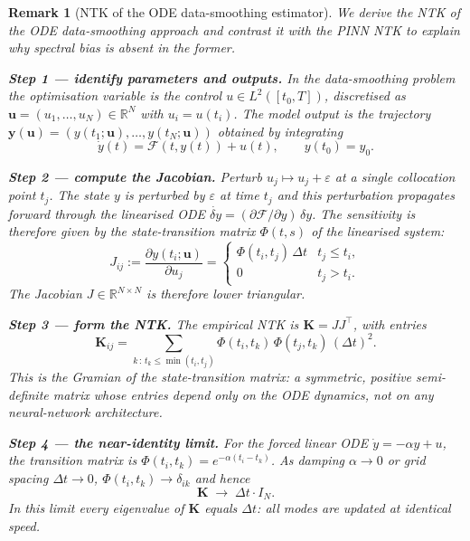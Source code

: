\documentclass{article}
\newtheorem{remark}{Remark}
\begin{document}
\begin{remark}[NTK of the ODE data-smoothing estimator]
We derive the NTK of the ODE data-smoothing approach and contrast it with the
PINN NTK to explain why spectral bias is absent in the former.

\medskip
\noindent\textbf{Step 1 — identify parameters and outputs.}
In the data-smoothing problem the optimisation variable is the control
$u\in L^2([t_0,T])$, discretised as $\mathbf{u}=(u_1,\ldots,u_N)\in\mathbb{R}^N$
with $u_i=u(t_i)$.  The model output is the trajectory
$\mathbf{y}(\mathbf{u})=(y(t_1;\mathbf{u}),\ldots,y(t_N;\mathbf{u}))$
obtained by integrating
\begin{equation}
    \dot{y}(t)=\mathcal{F}(t,y(t))+u(t),\qquad y(t_0)=y_0.
\end{equation}

\medskip
\noindent\textbf{Step 2 — compute the Jacobian.}
Perturb $u_j\mapsto u_j+\varepsilon$ at a single collocation point $t_j$.
The state $y$ is perturbed by $\varepsilon$ at time $t_j$ and this perturbation
propagates forward through the linearised ODE
$\dot{\delta y}=(\partial\mathcal{F}/\partial y)\,\delta y$.  The sensitivity is
therefore given by the \emph{state-transition matrix} $\Phi(t,s)$ of the
linearised system:
\begin{equation}
    J_{ij} := \frac{\partial y(t_i;\mathbf{u})}{\partial u_j}
    = \begin{cases}\Phi(t_i,t_j)\,\Delta t & t_j \le t_i,\\ 0 & t_j > t_i.\end{cases}
\end{equation}
The Jacobian $J\in\mathbb{R}^{N\times N}$ is therefore \emph{lower triangular}.

\medskip
\noindent\textbf{Step 3 — form the NTK.}
The empirical NTK is $\mathbf{K}=JJ^{\top}$, with entries
\begin{equation}
    \mathbf{K}_{ij}
    = \sum_{k\,:\,t_k\le\min(t_i,t_j)}
      \Phi(t_i,t_k)\,\Phi(t_j,t_k)\,(\Delta t)^2.
\end{equation}
This is the \emph{Gramian of the state-transition matrix}: a symmetric,
positive semi-definite matrix whose entries depend only on the ODE dynamics,
not on any neural-network architecture.

\medskip
\noindent\textbf{Step 4 — the near-identity limit.}
For the forced linear ODE $\dot{y}=-\alpha y+u$, the transition matrix is
$\Phi(t_i,t_k)=e^{-\alpha(t_i-t_k)}$.
As damping $\alpha\to 0$ or grid spacing $\Delta t\to 0$,
$\Phi(t_i,t_k)\to\delta_{ik}$ and hence
\begin{equation}
    \mathbf{K} \;\to\; \Delta t\cdot I_N.
\end{equation}
In this limit every eigenvalue of $\mathbf{K}$ equals $\Delta t$: all modes are
updated at \emph{identical} speed.


\end{remark}
\end{document}
